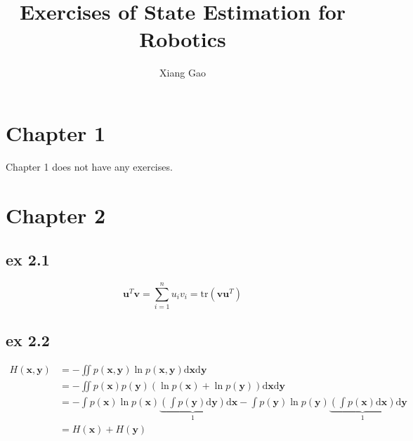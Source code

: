 \documentclass[10pt]{article}
\title{Exercises of State Estimation for Robotics}
\author{Xiang Gao}
\begin{document}
\maketitle
\section{Chapter 1}
Chapter 1 does not have any exercises.

\section{Chapter 2}
\subsection{ex 2.1}
\begin{equation}
{\mathbf{u}^T}\mathbf{v} = \sum\limits_{i = 1}^n {{u_i}{v_i}}  = \mathrm{tr}\left( {\mathbf{v}{\mathbf{u}^T}} \right)
\end{equation}

\subsection{ex 2.2}
\begin{equation}
\begin{split}
H\left( {\mathbf{x},\mathbf{y}} \right) &=  - \iint {p\left( {\mathbf{x},\mathbf{y}} \right)\ln }p\left( {\mathbf{x},\mathbf{y}} \right)\mathrm{d}\mathbf{x}\mathrm{d}\mathbf{y} \\ 
&=  - \iint {p\left( \mathbf{x} \right)p\left( \mathbf{y} \right)\left( {\ln p\left( \mathbf{x} \right) + \ln p\left( \mathbf{y} \right)} \right)\mathrm{d}\mathbf{x}\mathrm{d}\mathbf{y}} \\ 
&=  - \int {p\left( \mathbf{x} \right)\ln p\left( \mathbf{x} \right)\underbrace {\left( {\int {p\left( \mathbf{y} \right)\mathrm{d}\mathbf{y}} } \right)}_1\mathrm{d}\mathbf{x} - \int {p\left( \mathbf{y} \right)\ln p\left( \mathbf{y} \right)\underbrace {\left( {\int {p\left( \mathbf{x} \right)\mathrm{d}\mathbf{x}} } \right)}_1\mathrm{d}\mathbf{y}} }  \\ 
&= H\left( \mathbf{x} \right) + H\left( \mathbf{y} \right) \\ 
\end{split}
\end{equation}
\end{document}
